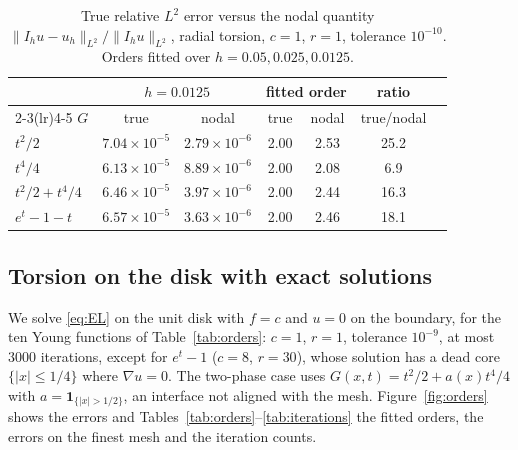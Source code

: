\documentclass[11pt]{amsart}
\theoremstyle{definition}
\theoremstyle{remark}
\numberwithin{equation}{section}
\newcommand{\abs}[1]{\lvert #1\rvert}
\newcommand{\norm}[1]{\lVert #1\rVert}
\begin{document}
\begin{table}[t]
\caption{True relative $L^2$ error versus the nodal quantity $\norm{I_hu-u_h}_{L^2}/\norm{I_hu}_{L^2}$, radial torsion, $c=1$, $r=1$, tolerance $10^{-10}$. Orders fitted over $h=0.05,0.025,0.0125$.}\label{tab:superclose}
\small
\begin{tabular}{@{}lcccccc@{}}
\toprule
& \multicolumn{2}{c}{$h=0.0125$} & \multicolumn{2}{c}{fitted order} & ratio\\
\cmidrule(lr){2-3}\cmidrule(lr){4-5}
$G$ & true & nodal & true & nodal & true/nodal\\
\midrule
$t^2/2$ & $7.04\times10^{-5}$ & $2.79\times10^{-6}$ & 2.00 & 2.53 & 25.2\\
$t^4/4$ & $6.13\times10^{-5}$ & $8.89\times10^{-6}$ & 2.00 & 2.08 & 6.9\\
$t^2/2+t^4/4$ & $6.46\times10^{-5}$ & $3.97\times10^{-6}$ & 2.00 & 2.44 & 16.3\\
$e^t-1-t$ & $6.57\times10^{-5}$ & $3.63\times10^{-6}$ & 2.00 & 2.46 & 18.1\\
\bottomrule
\end{tabular}
\end{table}

\subsection{Torsion on the disk with exact solutions}\label{ssec:torsion}
We solve \eqref{eq:EL} on the unit disk with $f=c$ and $u=0$ on the boundary, for the ten Young functions of Table~\ref{tab:orders}: $c=1$, $r=1$, tolerance $10^{-9}$, at most $3000$ iterations, except for $e^t-1$ ($c=8$, $r=30$), whose solution has a dead core $\{\abs x\le1/4\}$ where $\nabla u=0$. The two-phase case uses $G(x,t)=t^2/2+a(x)t^4/4$ with $a=\mathbf 1_{\{\abs x>1/2\}}$, an interface not aligned with the mesh. Figure~\ref{fig:orders} shows the errors and Tables~\ref{tab:orders}--\ref{tab:iterations} the fitted orders, the errors on the finest mesh and the iteration counts.
\end{document}
